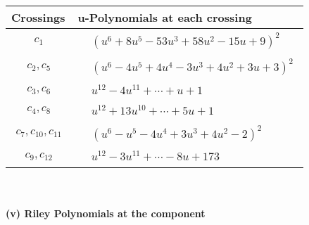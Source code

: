 \documentclass[1p]{elsarticle_modified}
\theoremstyle{definition}
\begin{document}
\begin{tabular}{m{50pt}|m{274pt}}
Crossings & \hspace{64pt}u-Polynomials at each crossing \\
\hline $$\begin{aligned}c_{1}\end{aligned}$$&$\begin{aligned}
&(u^6+8 u^5-53 u^3+58 u^2-15 u+9)^2
\end{aligned}$\\
\hline $$\begin{aligned}c_{2},c_{5}\end{aligned}$$&$\begin{aligned}
&(u^6-4 u^5+4 u^4-3 u^3+4 u^2+3 u+3)^2
\end{aligned}$\\
\hline $$\begin{aligned}c_{3},c_{6}\end{aligned}$$&$\begin{aligned}
&u^{12}-4 u^{11}+\cdots+u+1
\end{aligned}$\\
\hline $$\begin{aligned}c_{4},c_{8}\end{aligned}$$&$\begin{aligned}
&u^{12}+13 u^{10}+\cdots+5 u+1
\end{aligned}$\\
\hline $$\begin{aligned}c_{7},c_{10},c_{11}\end{aligned}$$&$\begin{aligned}
&(u^6- u^5-4 u^4+3 u^3+4 u^2-2)^2
\end{aligned}$\\
\hline $$\begin{aligned}c_{9},c_{12}\end{aligned}$$&$\begin{aligned}
&u^{12}-3 u^{11}+\cdots-8 u+173
\end{aligned}$\\
\hline
\end{tabular}\\~\\
\newpage\renewcommand{\arraystretch}{1}
\flushleft \textbf{(v) Riley Polynomials at the component}\newline \\
\end{document}
